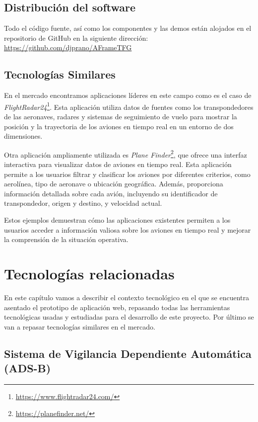 \documentclass[a4paper, 11pt]{book}
\begin{document}
\section{Distribución del software}
\label{sec:planificacion-temporal}
Todo el código fuente, así como los componentes y las demos están alojados en el repositorio de GitHub en la siguiente dirección: \url{https://github.com/djprano/AFrameTFG}
\section{Tecnologías Similares}
\label{sec:tecnosimilares}
En el mercado encontramos aplicaciones líderes en este campo como es el caso de \emph{FlightRadar24}\footnote{\url{https://www.flightradar24.com/}}. Esta aplicación utiliza datos de fuentes como los transpondedores de las aeronaves, radares y sistemas de seguimiento de vuelo para mostrar la posición y la trayectoria de los aviones en tiempo real en un entorno de dos dimensiones.

Otra aplicación ampliamente utilizada es \emph{Plane Finder}\footnote{\url{https://planefinder.net/}}, que ofrece una interfaz interactiva para visualizar datos de aviones en tiempo real. Esta aplicación permite a los usuarios filtrar y clasificar los aviones por diferentes criterios, como aerolínea, tipo de aeronave o ubicación geográfica. Además, proporciona información detallada sobre cada avión, incluyendo su identificador de transpondedor, origen y destino, y velocidad actual.

Estos ejemplos demuestran cómo las aplicaciones existentes permiten a los usuarios acceder a información valiosa sobre los aviones en tiempo real y mejorar la comprensión de la situación operativa.

\chapter{Tecnologías relacionadas}
\label{chap:tecnologias}
En este capítulo vamos a describir el contexto tecnológico en el que se encuentra asentado el prototipo de aplicación web, repasando todas las herramientas tecnológicas usadas y estudiadas para el desarrollo de este proyecto.
Por último se van a repasar tecnologías similares en el mercado.
\section{Sistema de Vigilancia Dependiente Automática (ADS-B)}
\label{sec:adsb}
\end{document}
